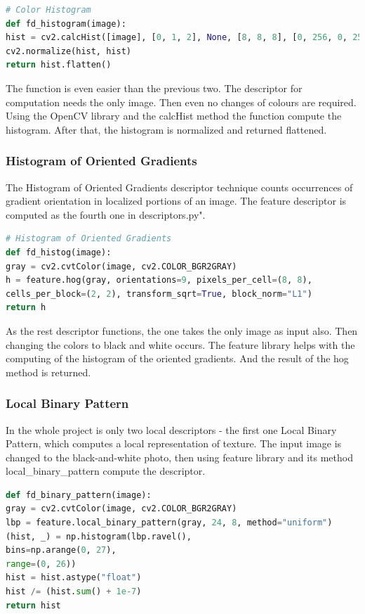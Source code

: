 \documentclass[12pt]{article}
\begin{document}
\begin{lstlisting}[language=Python]
# Color Histogram
def fd_histogram(image):
hist = cv2.calcHist([image], [0, 1, 2], None, [8, 8, 8], [0, 256, 0, 256, 0, 256])
cv2.normalize(hist, hist)
return hist.flatten()
\end{lstlisting}

The function is even easier than the previous two. The descriptor for computation needs the only image. Then even no changes of colours are required. Using the OpenCV library and the calcHist method the function compute the histogram. After that, the histogram is normalized and returned flattened.

\subsubsection{Histogram of Oriented Gradients}

The Histogram of Oriented Gradients descriptor technique counts occurrences of gradient orientation in localized portions of an image.
The feature descriptor is computed as the fourth one in descriptors.py".

\begin{lstlisting}[language=Python]
# Histogram of Oriented Gradients
def fd_histog(image):
gray = cv2.cvtColor(image, cv2.COLOR_BGR2GRAY)
h = feature.hog(gray, orientations=9, pixels_per_cell=(8, 8),
cells_per_block=(2, 2), transform_sqrt=True, block_norm="L1")
return h
\end{lstlisting}

As the rest descriptor functions, the one takes the only image as input also. Then changing the colors to black and white occurs. The feature library helps with the computing of the histogram of the oriented gradients. And the result of the hog method is returned.

\subsubsection{Local Binary Pattern}

In the whole project is only two local descriptors - the first one Local Binary Pattern, which computes a local representation of texture.
The input image is changed to the black-and-white photo, then using feature library and its method local\_binary\_pattern compute the descriptor.

\begin{lstlisting}[language=Python]
def fd_binary_pattern(image):
gray = cv2.cvtColor(image, cv2.COLOR_BGR2GRAY)
lbp = feature.local_binary_pattern(gray, 24, 8, method="uniform")
(hist, _) = np.histogram(lbp.ravel(),
bins=np.arange(0, 27),
range=(0, 26))
hist = hist.astype("float")
hist /= (hist.sum() + 1e-7)
return hist
\end{lstlisting}
\end{document}
